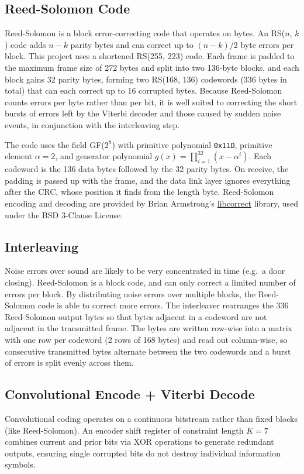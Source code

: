 \documentclass{article}
\begin{document}
\subsection{Reed-Solomon Code}
Reed-Solomon is a block error-correcting code that operates on bytes. An RS($n$, $k$) code adds $n - k$
parity bytes and can correct up to $(n - k)/2$ byte errors per block. This project uses a shortened RS(255, 223) code. Each frame is padded to the maximum frame size of 272 bytes and split into two 136-byte blocks, and each block gains 32 
parity bytes, forming two RS(168, 136) codewords (336 bytes in total) that can each correct up to 16 corrupted bytes. Because Reed-Solomon counts errors per byte rather than per bit, it is well suited to correcting the short bursts of errors left by the Viterbi decoder and those caused by sudden noise events, in conjunction with 
the interleaving step.

The code uses the field GF($2^8$) with primitive polynomial \texttt{0x11D}, primitive element $\alpha = 2$, and generator polynomial $g(x) = \prod_{i=1}^{32} (x - \alpha^i)$. Each codeword is the 136 data bytes followed by the 32 parity bytes. On receive, the padding is passed up with the frame, and the data link layer ignores everything after the CRC, whose position it finds from the length byte. Reed-Solomon encoding and decoding are provided by Brian Armstrong's \href{https://github.com/quiet/libcorrect}{libcorrect} library, used under the BSD 3-Clause License.

\subsection{Interleaving}
Noise errors over sound are likely to be very concentrated in time (e.g.\ a door closing). Reed-Solomon is a block code, and can only correct a limited number of errors per block.
By distributing noise errors over multiple blocks, the Reed-Solomon code is able to correct more errors. The interleaver rearranges the 336 Reed-Solomon output bytes so that bytes adjacent in a codeword are not adjacent in the transmitted frame.
The bytes are written row-wise into a matrix with one row per codeword (2 rows of 168 bytes) and read out column-wise, so consecutive transmitted bytes alternate between the two codewords and a burst of errors is split evenly across them.

\subsection{Convolutional Encode + Viterbi Decode}
Convolutional coding operates on a continuous bitstream rather than fixed blocks (like Reed-Solomon). An encoder shift register of constraint length $K = 7$ combines current and prior bits via XOR operations to generate redundant outputs, ensuring single corrupted bits do not destroy individual information symbols.
\end{document}
